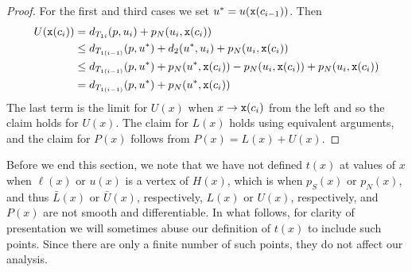 \begin{proof}
For the first and third cases we set $u^* =  u({\tt x}(c_{i-1}))$. Then
\begin{align*} 
U({\tt x}(c_i)) & = d_{T_{1i}}(p,u_i) + p_N(u_i, {\tt x}(c_i)) \\ 
       & \leq d_{T_{1(i-1)}}(p,u^*) + d_2(u^*,u_i) + p_N(u_i, {\tt x}(c_i)) \\ 
       & \leq d_{T_{1(i-1)}}(p,u^*) + p_N(u^*,{\tt x}(c_i)) - p_N(u_i,{\tt x}(c_i)) + p_N(u_i, {\tt x}(c_i)) \\ \nonumber
       & = d_{T_{1(i-1)}}(p,u^*) + p_N(u^*, {\tt x}(c_i)) \nonumber
\end{align*}
The last term is the limit for $U(x)$ when $x \rightarrow {\tt x}(c_i)$
from the left and so the claim holds for $U(x)$.
The claim for $L(x)$ holds using equivalent arguments, and the claim for 
$P(x)$ follows from $P(x) = L(x) + U(x)$.
\end{proof}

Before we end this section, we note that we have not defined $t(x)$ at values
of $x$ when $\ell(x)$ or $u(x)$
is a vertex of $H(x)$, which is when $p_S(x)$ or $p_N(x)$, and thus
$\bar{L}(x)$ or $\bar{U}(x)$, respectively, $L(x)$ or $U(x)$, respectively, 
and $P(x)$ are not smooth
and differentiable. In what follows, for clarity of presentation we will
sometimes abuse our definition of $t(x)$ to include such points. Since there
are only a finite number of such points, they do not affect our analysis.




